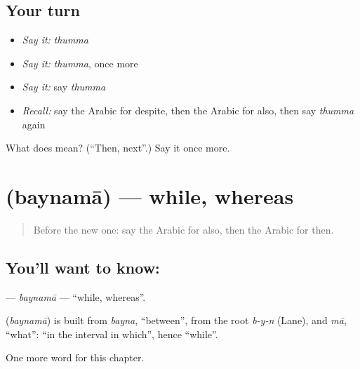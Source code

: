 \subsection*{Your turn}
\begin{itemize}
\raggedright
  \item \emph{Say it:} \emph{thumma}
  \item \emph{Say it:} \emph{thumma}, once more
  \item \emph{Say it:} say \emph{thumma}
  \item \emph{Recall:} say the Arabic for despite, then the Arabic for also, then say \emph{thumma} again
\end{itemize}

\begin{tcolorbox}[breakable,colback=teal!4,colframe=teal!35!black,title={Before you move on}]
What does  mean? (\textquotedblleft{}Then, next\textquotedblright{}.) Say it once more.
\end{tcolorbox}
\section[\texorpdfstring{\ar{بينما} (baynamā)}{بينما (baynamā)}]{ (baynamā) — while, whereas}

\label{lesson:AR-C176-baynama}



\begin{quote}
Before the new one: say the Arabic for also, then the Arabic for then.
\end{quote}

\subsection*{You'll want to know: }
\textbf{} — \emph{baynamā} — \textquotedblleft{}while, whereas\textquotedblright{}.

\begin{cousinweb}
\textbf{} (\emph{baynamā}) is built from \emph{bayna}, \textquotedblleft{}between\textquotedblright{}, from the root \emph{b-y-n} (Lane), and \emph{mā}, \textquotedblleft{}what\textquotedblright{}: \textquotedblleft{}in the interval in which\textquotedblright{}, hence \textquotedblleft{}while\textquotedblright{}.
\end{cousinweb}

\begin{grammarlens}[title={What you've built}]
One more word for this chapter.
\end{grammarlens}

